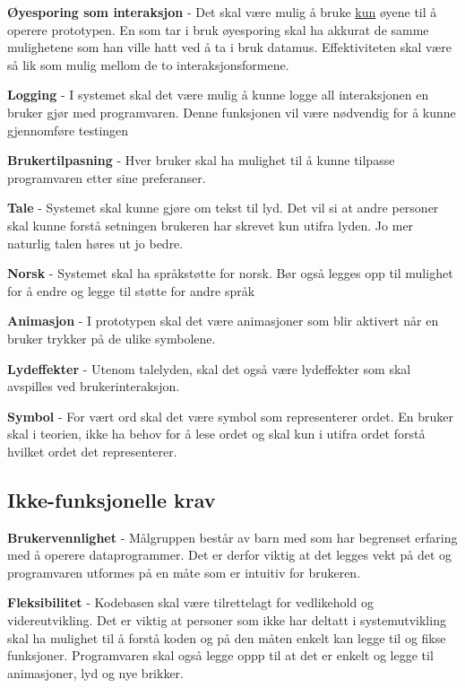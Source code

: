  
\textbf{Øyesporing som interaksjon} - Det skal være mulig å bruke \underline{kun} øyene til å operere prototypen. En som tar i bruk øyesporing skal ha akkurat de samme mulighetene som han ville hatt ved å ta i bruk datamus. Effektiviteten skal være så lik som mulig mellom de to interaksjonsformene. 
 
\textbf{Logging} - I systemet skal det være mulig å kunne logge all interaksjonen en bruker gjør med programvaren. Denne funksjonen vil være nødvendig for å kunne gjennomføre testingen 
 
\textbf{Brukertilpasning} - Hver bruker skal ha mulighet til å kunne tilpasse programvaren etter sine preferanser. 
  
\textbf{Tale} - Systemet skal kunne gjøre om tekst til lyd. Det vil si at andre personer skal kunne forstå setningen brukeren har skrevet kun utifra lyden. Jo mer naturlig talen høres ut jo bedre.
  
\textbf{Norsk} - Systemet skal ha språkstøtte for norsk. Bør også legges opp til mulighet for å endre og legge til støtte for andre språk 
 
\textbf{Animasjon} - I prototypen skal det være animasjoner som blir aktivert når en bruker trykker på de ulike symbolene.  

\textbf{Lydeffekter} - Utenom talelyden, skal det også være lydeffekter som skal avspilles ved brukerinteraksjon.  
 
\textbf{Symbol} - For vært ord skal det være symbol som representerer ordet. En bruker skal i teorien, ikke ha behov for å lese ordet og skal kun i utifra ordet forstå hvilket ordet det representerer. 


 
\subsection{Ikke-funksjonelle krav} 
 
 
\textbf{Brukervennlighet} - Målgruppen består av barn med som har begrenset erfaring med å operere dataprogrammer. Det er derfor viktig at det legges vekt på det og programvaren utformes på en måte som er intuitiv for brukeren.   
 
 
\textbf{Fleksibilitet} - Kodebasen skal være tilrettelagt for vedlikehold og videreutvikling. Det er viktig at personer som ikke har deltatt i systemutvikling skal ha mulighet til å forstå koden og på den måten enkelt kan legge til og fikse funksjoner. Programvaren skal også legge oppp til at det er enkelt og legge til animasjoner, lyd og nye brikker. 
 
